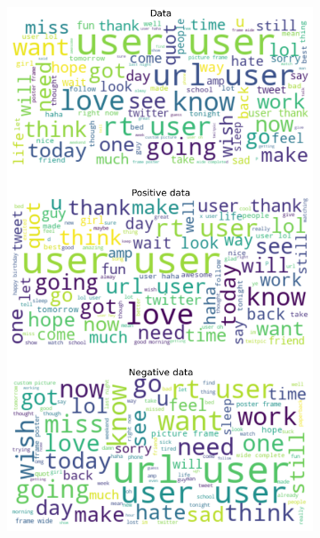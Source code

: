 \documentclass{article}
\begin{document}
\begin{itemize}
\begin{figure}[H]
\centering
\captionsetup{justification=centering}
\begin{subfigure}[b]{0.24\textwidth}
\centering
\includegraphics[width=\textwidth]{chapter-06/section-01-01/17/visualization/1/wordcloud.png}
\end{subfigure}
\begin{subfigure}[b]{0.24\textwidth}
\centering

\end{subfigure}
\end{figure}
\end{itemize}
\end{document}
